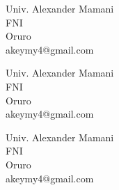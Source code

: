 \documentclass[a4paper,12pt]{article}
\newcommand{\director}{Ing Andy Cepedes }				%
\begin{document}
\begin{titlepage}
{{\begin{center}
\begin{minipage}[b]{6cm}
	\begin{center}
		Univ. Alexander Mamani\\
		FNI\\
		Oruro\\
		akeymy4@gmail.com
	\end{center}
\end{minipage} \hfill \begin{minipage}[b]{6cm}
	\begin{center}
		Univ. Alexander Mamani\\
		FNI\\
		Oruro\\
		akeymy4@gmail.com
	\end{center}
\end{minipage} \hfill \begin{minipage}[b]{6cm}
	\begin{center}
		Univ. Alexander Mamani\\
		FNI\\
		Oruro\\
		akeymy4@gmail.com 
	\end{center}

\end{minipage}\\
[0.9cm]
{\fontsize{12}{3}\selectfont{Director :}}\\
[0.5cm]
{\fontsize{12}{3}\selectfont{\director}}\\
[3cm]
{\fontsize{12}{3}\selectfont{Oruro, 2018}}\\[1cm]
\end{center}

}}
 
 

 \restoregeometry  					%

\end{titlepage}
\end{document}
